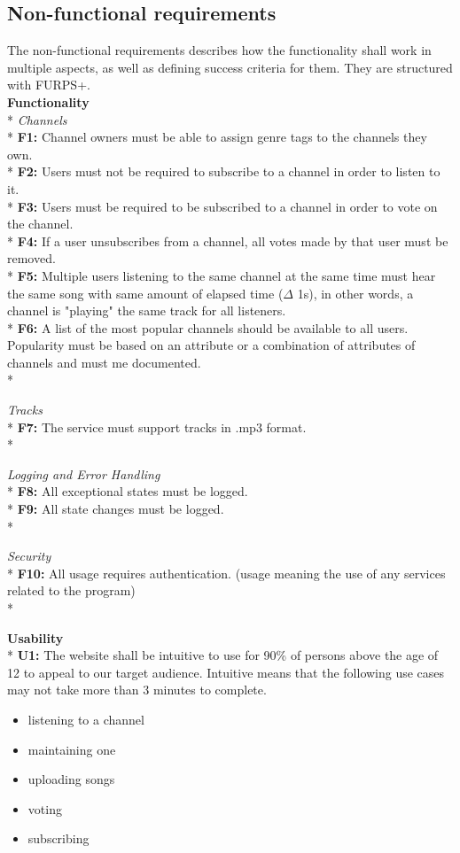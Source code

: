 \documentclass[a4paper,11pt,report]{article}
\begin{document}
\subsection{Non-functional requirements}
The non-functional requirements describes how the functionality shall work in multiple aspects, as well as defining success criteria for them. They are structured with FURPS+. \\

\textbf{Functionality} \\*
\textit{Channels} \\*
\textbf{F1:} Channel owners must be able to assign genre tags to the channels they own. \\*
\textbf{F2:} Users must not be required to subscribe to a channel in order to listen to it. \\*
\textbf{F3:} Users must be required to be subscribed to a channel in order to vote on the channel. \\*
\textbf{F4:} If a user unsubscribes from a channel, all votes made by that user must be removed.\\*
\textbf{F5:} Multiple users listening to the same channel at the same time must hear the same song with same amount of elapsed time (\(\Delta\) 1s), in other words, a channel is "playing" the same track for all listeners. \\*
\textbf{F6:} A list of the most popular channels should be available to all users. Popularity must be based on an attribute or a combination of attributes of channels and must me documented. \\*

\textit{Tracks} \\*
\textbf{F7:} The service must support tracks in .mp3 format. \\*

\textit{Logging and Error Handling} \\*
\textbf{F8:} All exceptional states must be logged.\\*
\textbf{F9:} All state changes must be logged.\\*

\textit{Security} \\*
\textbf{F10:} All usage requires authentication. (usage meaning the use of any services related to the program)\\*

\textbf{Usability} \\*
\textbf{U1:} The website shall be intuitive to use for 90\% of persons above the age of 12 to appeal to our target audience. Intuitive means that the following use cases may not take more than 3 minutes to complete.
\begin{itemize}
\item listening to a channel
\item maintaining one 
\item uploading songs
\item voting
\item subscribing
\end{itemize}
\end{document}
